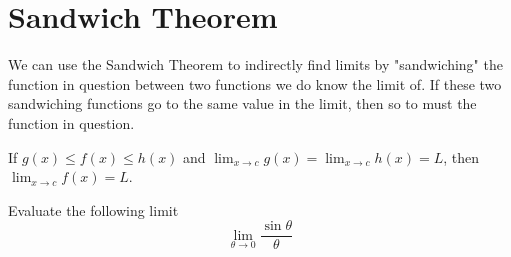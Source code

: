 \section{Sandwich Theorem}
We can use the Sandwich Theorem to indirectly find limits by "sandwiching" the function in question between two functions we do know the limit of.
If these two sandwiching functions go to the same value in the limit, then so to must the function in question.
\begin{theorem}
	If $g(x) \leq f(x) \leq h(x)$ and $\lim_{x \to c}{g(x)} = \lim_{x\to c}{h(x)} = L$, then $\lim_{x \to c}{f(x)} = L$.
\end{theorem}

\begin{example}
	Evaluate the following limit
	\begin{equation*}
		\lim_{\theta \to 0}{\frac{\sin{\theta}}{\theta}}
	\end{equation*}
\end{example}
